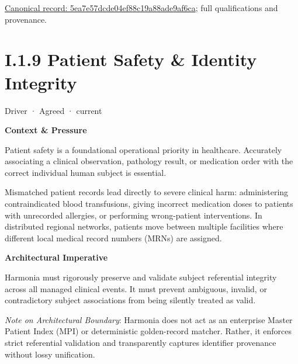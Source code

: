 {\footnotesize \href{../../../../continuum/motivation/driver/5ea7e57dcde04ef88c19a88ade9af6ca.md}{Canonical record: 5ea7e57dcde04ef88c19a88ade9af6ca}; full qualifications and provenance.}\par
\section*{I.1.9 Patient Safety \& Identity Integrity}
\label{navigation:I.1.9}

\label{element:b835c7b1055e4dbc9e1cd3a0c545c1c8}
{\small Driver · Agreed · current}\par

\par\medskip\textbf{Context \& Pressure}\par


Patient safety is a foundational operational priority in healthcare. Accurately associating a clinical observation, pathology result, or medication order with the correct individual human subject is essential.



Mismatched patient records lead directly to severe clinical harm: administering contraindicated blood transfusions, giving incorrect medication doses to patients with unrecorded allergies, or performing wrong-patient interventions. In distributed regional networks, patients move between multiple facilities where different local medical record numbers (MRNs) are assigned.



\par\medskip\textbf{Architectural Imperative}\par


Harmonia must rigorously preserve and validate subject referential integrity across all managed clinical events. It must prevent ambiguous, invalid, or contradictory subject associations from being silently treated as valid.



\emph{Note on Architectural Boundary}: Harmonia does not act as an enterprise Master Patient Index (MPI) or deterministic golden-record matcher. Rather, it enforces strict referential validation and transparently captures identifier provenance without lossy unification.



